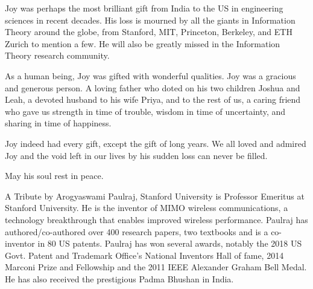 \begin{multicols}{2}
Joy was perhaps the most brilliant gift from India to the US in engineering sciences in recent decades. His loss is mourned by all the giants in Information Theory around the globe, from Stanford, MIT, Princeton, Berkeley, and ETH Zurich to mention a few. He will also be greatly missed in the Information Theory research community.

As a human being, Joy was gifted with wonderful qualities. Joy was a gracious and generous person. A loving father who doted on his two children Joshua and Leah, a devoted husband to his wife Priya, and to the rest of us,  a caring friend who gave us strength in time of trouble, wisdom in time of uncertainty, and sharing in time of happiness. 

Joy indeed had every gift, except the gift of long years. We all loved and admired Joy and the void left in our lives by his sudden loss can never be filled.

May his soul rest in peace.

A Tribute by Arogyaswami Paulraj, Stanford University is Professor Emeritus at Stanford University. He is the inventor of MIMO wireless communications, a technology breakthrough that enables improved wireless performance. Paulraj has authored/co-authored over 400 research papers, two textbooks and is a co-inventor in 80 US patents. Paulraj has won several awards, notably the 2018 US Govt. Patent and Trademark Office’s National Inventors Hall of fame, 2014 Marconi Prize and Fellowship and the 2011 IEEE Alexander Graham Bell Medal. He has also received the prestigious Padma Bhushan in India. 

\end{multicols}


